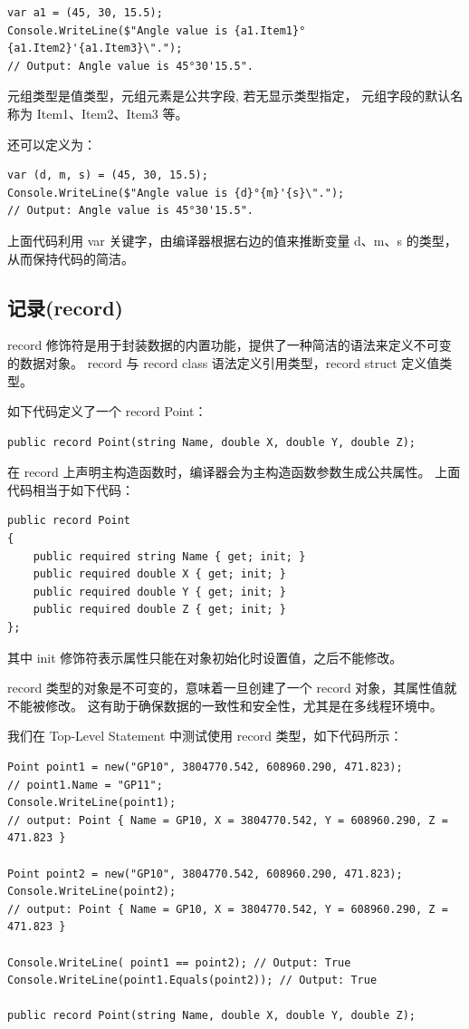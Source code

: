\begin{lstlisting}
var a1 = (45, 30, 15.5);
Console.WriteLine($"Angle value is {a1.Item1}°{a1.Item2}'{a1.Item3}\".");
// Output: Angle value is 45°30'15.5".
\end{lstlisting}

元组类型是值类型，元组元素是公共字段, 若无显示类型指定， 元组字段的默认名称为 Item1、Item2、Item3 等。

还可以定义为：

\begin{lstlisting}
var (d, m, s) = (45, 30, 15.5);
Console.WriteLine($"Angle value is {d}°{m}'{s}\".");
// Output: Angle value is 45°30'15.5".
\end{lstlisting}

上面代码利用 var 关键字，由编译器根据右边的值来推断变量 d、m、s 的类型， 从而保持代码的简洁。

\subsection{记录(record)}

record 修饰符是用于封装数据的内置功能，提供了一种简洁的语法来定义不可变的数据对象。
record 与 record class 语法定义引用类型，record struct 定义值类型。

如下代码定义了一个 record Point：
\begin{lstlisting}
public record Point(string Name, double X, double Y, double Z);
\end{lstlisting}

在 record 上声明主构造函数时，编译器会为主构造函数参数生成公共属性。
上面代码相当于如下代码：
\begin{lstlisting}
public record Point
{
    public required string Name { get; init; }
    public required double X { get; init; }
    public required double Y { get; init; }
    public required double Z { get; init; }
};
\end{lstlisting}

其中 init 修饰符表示属性只能在对象初始化时设置值，之后不能修改。

record 类型的对象是不可变的，意味着一旦创建了一个 record 对象，其属性值就不能被修改。
这有助于确保数据的一致性和安全性，尤其是在多线程环境中。

我们在 Top-Level Statement 中测试使用 record 类型，如下代码所示：

\begin{lstlisting}
Point point1 = new("GP10", 3804770.542, 608960.290, 471.823);
// point1.Name = "GP11";
Console.WriteLine(point1);
// output: Point { Name = GP10, X = 3804770.542, Y = 608960.290, Z = 471.823 }

Point point2 = new("GP10", 3804770.542, 608960.290, 471.823);
Console.WriteLine(point2);
// output: Point { Name = GP10, X = 3804770.542, Y = 608960.290, Z = 471.823 }

Console.WriteLine( point1 == point2); // Output: True
Console.WriteLine(point1.Equals(point2)); // Output: True

public record Point(string Name, double X, double Y, double Z);
\end{lstlisting}

